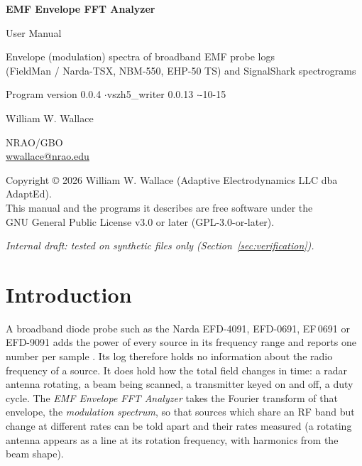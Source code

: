 \documentclass[10pt,letterpaper]{article}
\numberwithin{equation}{section}
\begin{document}
\begin{titlepage}
\centering
\vspace*{3cm}
{\Huge\bfseries EMF Envelope FFT Analyzer\par}
\vspace{0.6cm}
{\Large User Manual\par}
\vspace{1.2cm}
{\large Envelope (modulation) spectra of broadband EMF probe logs\\
(FieldMan / Narda-TSX, NBM-550, EHP-50 TS) and SignalShark spectrograms\par}
\vspace{1.5cm}
{\large Program version 0.0.4 \quad$\cdot$\quad vszh5\_writer 0.0.13 \quad$\cdot$-10-15\par}
\vspace{2cm}
{\large William W. Wallace\par}
NRAO/GBO\\
\href{mailto:wwallace@nrao.edu}{wwallace@nrao.edu}\par
\vfill
{\small Copyright \copyright{} 2026 William W. Wallace (Adaptive Electrodynamics LLC dba AdaptEd).\\
This manual and the programs it describes are free software under the\\
GNU General Public License v3.0 or later (GPL-3.0-or-later).\par}
\vspace{0.5cm}
{\small\itshape Internal draft: tested on synthetic files only (Section~\ref{sec:verification}).\par}
\end{titlepage}

\tableofcontents
\clearpage
{}
\listoftables
{}
\listoffigures
\clearpage

\section{Introduction}\label{sec:intro}

A broadband diode probe such as the Narda EFD-4091, EFD-0691, EF\,0691 or
EFD-9091 adds the power of every source in its frequency range and reports one
number per sample \cite{R1,R2,R3}. Its log therefore holds no information about
the radio frequency of a source. It does hold how the total field changes in
time: a radar antenna rotating, a beam being scanned, a transmitter keyed on and
off, a duty cycle. The \emph{EMF Envelope FFT Analyzer} takes the Fourier
transform of that envelope, the \emph{modulation spectrum}, so that sources which
share an RF band but change at different rates can be told apart and their rates
measured (a rotating antenna appears as a line at its rotation frequency, with
harmonics from the beam shape).
\end{document}
